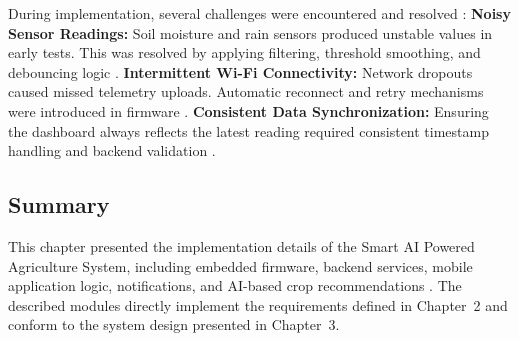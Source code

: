 During implementation, several challenges were encountered and 
resolved \cite{noisyiot2023}:
\textbf{Noisy Sensor Readings:} Soil moisture and rain sensors produced unstable values in early tests. This was resolved by applying filtering, threshold smoothing, and debouncing logic \cite{noisyiot2023}. \textbf{Intermittent Wi-Fi Connectivity:} Network dropouts caused missed telemetry uploads. Automatic reconnect and retry mechanisms were introduced in firmware \cite{farhan2019iotplatform}. \textbf{Consistent Data Synchronization:} Ensuring the dashboard always reflects the latest reading required consistent timestamp handling and backend validation \cite{thilakarathne2023fields}.


\subsection{Summary}
\label{sec:chapter4-summary}

This chapter presented the implementation details of the Smart AI 
Powered Agriculture System, including embedded firmware, backend 
services, mobile application logic, notifications, and AI-based 
crop recommendations \cite{ali2025soilml}. The described modules 
directly implement the requirements defined in Chapter~2 and 
conform to the system design presented in Chapter~3.

\setcounter{chapter}{4}